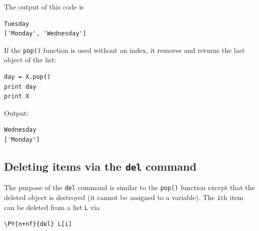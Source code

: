\noindent
The output of this code is\\

\begin{ybox}
\begin{Verbatim}[commandchars=\\\{\}]
Tuesday
['Monday', 'Wednesday']
\end{Verbatim}
\end{ybox}
\vspace{6mm}

\noindent
If the {\tt pop()} function is used without an index, it removes
and returns the last object of the list:\\

\begin{bbox}
\begin{Verbatim}[commandchars=\\\{\}]
day = X.pop()
print day
print X
\end{Verbatim}
\end{bbox}
\vspace{6mm}

\noindent
Output:\\

\begin{ybox}
\begin{Verbatim}[commandchars=\\\{\}]
Wednesday
['Monday']
\end{Verbatim}
\end{ybox}
\vspace{6mm}

\subsection[\ \ Deleting items via the {\tt del} command]{Deleting items via the {\tt del} command}

\noindent
The purpose of the {\tt del} command is similar to the {\tt pop()} function
except that the deleted object is destroyed (it cannot be assigned to a variable).
The {\tt i}th item can be deleted from a list {\tt L} via \\

\begin{bbox}
\begin{Verbatim}[commandchars=\\\{\}]
\PY{n+nf}{del} L[i]
\end{Verbatim}
\end{bbox}
\vspace{6mm}

